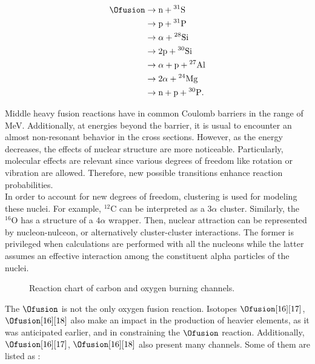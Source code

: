 \documentclass[openany]{book}
\begin{document}
\begin{equation}\label{eq:middleFusion_experimental_16O16O_channels}
	\begin{split}
		\Ofusion &\rightarrow \mathrm{n + {}^{31}S} \\
		&\rightarrow \mathrm{p + {}^{31}P} \\
		&\rightarrow \mathrm{\alpha + {}^{28}Si} \\
		&\rightarrow \mathrm{2p + {}^{30}Si} \\
		&\rightarrow \mathrm{\alpha + p + {}^{27}Al} \\
		&\rightarrow \mathrm{2\alpha + {}^{24}Mg} \\
		&\rightarrow \mathrm{n + p + {}^{30}P}. \\
	\end{split}
\end{equation}

Middle heavy fusion reactions have in common Coulomb barriers in the range of MeV. Additionally, at energies beyond the barrier, it is usual to encounter an almost non-resonant behavior in the cross sections. However, as the energy decreases, the effects of nuclear structure are more noticeable. Particularly, molecular effects are relevant since various degrees of freedom like rotation or vibration are allowed. Therefore, new possible transitions enhance reaction probabilities. \\

In order to account for new degrees of freedom, clustering is used for modeling these nuclei. For example, $\mathrm{{}^{12}C}$ can be interpreted as a $3\alpha$ cluster. Similarly, the $\mathrm{{}^{16}O}$  has a structure of a $4\alpha$ wrapper. Then, nuclear attraction can be represented by nucleon-nulceon, or alternatively cluster-cluster interactions. The former is privileged when calculations are performed with all the nucleons while the latter assumes an effective interaction among the constituent alpha particles of the nuclei.  \\

\begin{figure}[H]
	
	\caption[Carbon and oxygen burning main channels.]{Reaction chart of carbon and oxygen burning channels.}
	\label{fig:COchannels}
\end{figure}

The $\Ofusion$ is not the only oxygen fusion reaction.  Isotopes $\Ofusion[16][17]$, $\Ofusion[16][18]$ also make an impact in the production of heavier elements, as it was anticipated earlier, and in constraining the $\Ofusion$ reaction. Additionally, $\Ofusion[16][17]$, $\Ofusion[16][18]$ also present many channels. Some of them are listed as \cite{thomas_chen_hinds_meredith_olson_1986}: 
\end{document}
